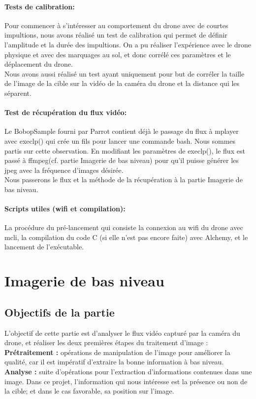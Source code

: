 \documentclass[12pt]{article}
\begin{document}
\paragraph*{Tests de calibration:}
Pour commencer à s'intéresser au comportement du drone avec de courtes impultions, nous avons réalisé un test de calibration qui permet de définir l'amplitude et la durée des impultions. On a pu réaliser l'expérience avec le drone physique et avec des marquages au sol, et donc corrélé ces paramètres et le déplacement du drone.\\
Nous avons aussi réalisé un test ayant uniquement pour but de corréler la taille de l'image de la cible sur la vidéo de la caméra du drone et la distance qui les séparent.

\paragraph*{Test de récupération du flux vidéo:}
Le BobopSample fourni par Parrot contient déjà le passage du flux à mplayer avec execlp() qui crée un fils pour lancer une commande bash. Nous sommes partis sur cette observation. En modifiant les paramètres de execlp(), le flux est passé à ffmpeg(cf. partie Imagerie de bas niveau) pour qu'il puisse générer les jpeg avec la fréquence d'images désirée. \\
Nous passerons le flux et la méthode de la récupération à la partie Imagerie de bas niveau.

\paragraph*{Scripts utiles (wifi et compilation):}

La procédure du pré-lancement qui consiste la connexion au wifi du drone avec mcli\cite{nmcli}, la compilation du code C (si elle n'est pas encore faite) avec Alchemy\cite{alchemy}, et le lancement de l'exécutable.


\section{Imagerie de bas niveau\label{bas}}
\subsection{Objectifs de la partie}
L'objectif de cette partie est d'analyser le flux vidéo capturé par la caméra du drone, et réaliser les deux premières étapes du traitement d'image : \\         
\textbf{Prétraitement : }opérations de
manipulation de l'image pour améliorer la
qualité, car il est impératif d'extraire la bonne information à bas niveau.
\textbf{Analyse : }suite d'opérations pour l'extraction
d'informations contenues dans une image. Dans ce projet, l'information qui nous intéresse est la présence ou non de la cible; et dans le cas favorable, sa position sur l'image.
\end{document}
